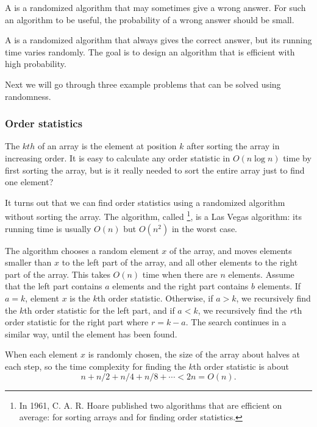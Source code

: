 
A  is a randomized algorithm
that may sometimes give a wrong answer.
For such an algorithm to be useful,
the probability of a wrong answer should be small.


A  is a randomized algorithm
that always gives the correct answer,
but its running time varies randomly.
The goal is to design an algorithm that is
efficient with high probability.

Next we will go through three example problems that
can be solved using randomness.

\subsubsection{Order statistics}


The $kth$  of an array
is the element at position $k$ after sorting
the array in increasing order.
It is easy to calculate any order statistic
in $O(n \log n)$ time by first sorting the array,
but is it really needed to sort the entire array
just to find one element?

It turns out that we can find order statistics
using a randomized algorithm without sorting the array.
The algorithm, called \footnote{In 1961,
    C. A. R. Hoare published two algorithms that
    are efficient on average:  
     \cite{hoa61a} for sorting arrays and
     \cite{hoa61b} for finding order statistics.}, is a Las Vegas algorithm:
its running time is usually $O(n)$
but $O(n^2)$ in the worst case.

The algorithm chooses a random element $x$
of the array, and moves elements smaller than $x$
to the left part of the array,
and all other elements to the right part of the array.
This takes $O(n)$ time when there are $n$ elements.
Assume that the left part contains $a$ elements
and the right part contains $b$ elements.
If $a=k$, element $x$ is the $k$th order statistic.
Otherwise, if $a>k$, we recursively find the $k$th order
statistic for the left part,
and if $a<k$, we recursively find the $r$th order
statistic for the right part where $r=k-a$.
The search continues in a similar way, until the element
has been found.

When each element $x$ is randomly chosen,
the size of the array about halves at each step,
so the time complexity for
finding the $k$th order statistic is about
\[n+n/2+n/4+n/8+\cdots < 2n = O(n).\]

